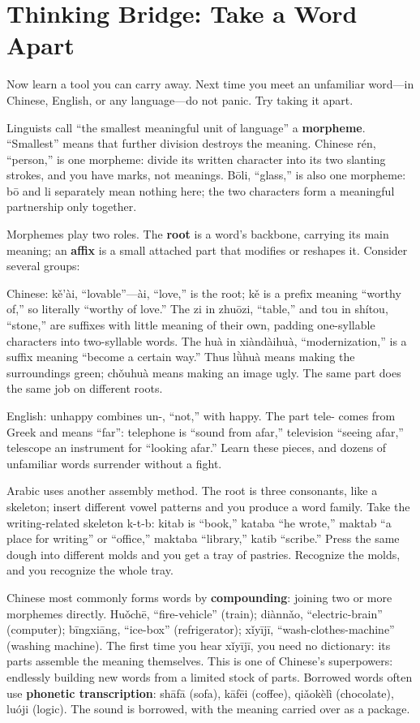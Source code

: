 \section{Thinking Bridge: Take a Word Apart}
Now learn a tool you can carry away. Next time you meet an unfamiliar word---in Chinese, English, or any language---do not panic. Try taking it apart.

Linguists call ``the smallest meaningful unit of language'' a \textbf{morpheme}. ``Smallest'' means that further division destroys the meaning. Chinese rén, ``person,'' is one morpheme: divide its written character into its two slanting strokes, and you have marks, not meanings. Bōli, ``glass,'' is also one morpheme: bō and li separately mean nothing here; the two characters form a meaningful partnership only together.

Morphemes play two roles. The \textbf{root} is a word's backbone, carrying its main meaning; an \textbf{affix} is a small attached part that modifies or reshapes it. Consider several groups:

Chinese: kě'ài, ``lovable''---ài, ``love,'' is the root; kě is a prefix meaning ``worthy of,'' so literally ``worthy of love.'' The zi in zhuōzi, ``table,'' and tou in shítou, ``stone,'' are suffixes with little meaning of their own, padding one-syllable characters into two-syllable words. The huà in xiàndàihuà, ``modernization,'' is a suffix meaning ``become a certain way.'' Thus lǜhuà means making the surroundings green; chǒuhuà means making an image ugly. The same part does the same job on different roots.

English: unhappy combines un-, ``not,'' with happy. The part tele- comes from Greek and means ``far'': telephone is ``sound from afar,'' television ``seeing afar,'' telescope an instrument for ``looking afar.'' Learn these pieces, and dozens of unfamiliar words surrender without a fight.

Arabic uses another assembly method. The root is three consonants, like a skeleton; insert different vowel patterns and you produce a word family. Take the writing-related skeleton k-t-b: kitab is ``book,'' kataba ``he wrote,'' maktab ``a place for writing'' or ``office,'' maktaba ``library,'' katib ``scribe.'' Press the same dough into different molds and you get a tray of pastries. Recognize the molds, and you recognize the whole tray.

Chinese most commonly forms words by \textbf{compounding}: joining two or more morphemes directly. Huǒchē, ``fire-vehicle'' (train); diànnǎo, ``electric-brain'' (computer); bīngxiāng, ``ice-box'' (refrigerator); xǐyījī, ``wash-clothes-machine'' (washing machine). The first time you hear xǐyījī, you need no dictionary: its parts assemble the meaning themselves. This is one of Chinese's superpowers: endlessly building new words from a limited stock of parts. Borrowed words often use \textbf{phonetic transcription}: shāfā (sofa), kāfēi (coffee), qiǎokèlì (chocolate), luóji (logic). The sound is borrowed, with the meaning carried over as a package.

